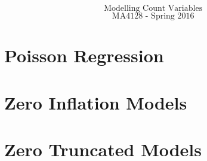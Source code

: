 \documentclass{beamer}
\begin{document}
\begin{frame}
	\huge
	\[ \mbox{Modelling Count Variables } \]
	\Large
	\[ \mbox{MA4128 - Spring 2016  } \]
	\end{frame}





\section{Poisson Regression}


%

% 

%
%
% 
\section{Zero Inflation Models}

% 


% 
\section{Zero Truncated Models}




%
\end{document}
